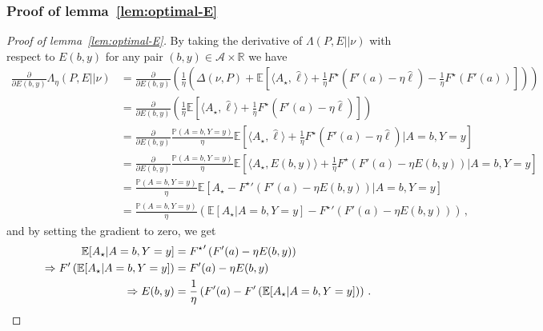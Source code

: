 \documentclass{article}
\theoremstyle{plain}
\theoremstyle{definition}
\renewcommand{\P}{\mathbb{P}}
\newcommand{\R}{\mathbb R}
\newcommand{\E}{\mathbb E}
\newcommand{\cA}{\mathcal A}
\newcommand{\hl}{\hat{\ell}\xspace}
\begin{document}
\subsubsection{Proof of lemma~\ref{lem:optimal-E}}
\label{proof:lem:optimal-E}
\begin{proof}[Proof of lemma~\ref{lem:optimal-E}]
    By taking the derivative of $\Lambda(P, E || \nu)$ with respect to $E(b,y)$
    for any pair $(b,y) \in \cA \times \R$ we have
    \begin{align*}
        \tfrac{\partial}{\partial E(b,y)} \Lambda_\eta(P, E || \nu)
         & =
        \tfrac{\partial}{\partial E(b,y)}
        \left(
        \frac{1}{\eta}
        \left(
            \Delta(\nu, P) +
            \E\!\left[
                    \langle A_\star, \hl \rangle
                    + \frac{1}{\eta} F^\star\left(F'(a) - \eta \hl\right)
                    - \frac{1}{\eta} F^\star(F'(a))
                    \right]
            \right)
        \right)
        \\
         & =
        \tfrac{\partial}{\partial E(b,y)}
        \left(
        \frac{1}{\eta}
        \E\!\left[
                \langle A_\star, \hl \rangle
                + \frac{1}{\eta} F^\star\left(F'(a) - \eta \hl\right)
                \right]
        \right) \\
         & =
        \tfrac{\partial}{\partial E(b,y)}
        \tfrac{\P(A=b, Y=y)}{\eta}
        \E\!\left[
            \langle A_\star, \hl \rangle
            + \frac{1}{\eta} F^\star\left(F'(a) - \eta \hl\right)
            \bigg| A = b, Y = y
        \right] \\
         & =
        \tfrac{\partial}{\partial E(b,y)}
        \tfrac{\P(A=b, Y=y)}{\eta}
        \E\!\left[
            \langle A_\star, E(b, y) \rangle
            + \frac{1}{\eta} F^\star\left(F'(a) - \eta E(b, y)\right)
            \bigg|A = b, Y = y
        \right] \\
         & =
        \tfrac{\P(A=b, Y=y)}{\eta}
        \E\!\left[
        A_\star
        - {F^\star}'\left(F'(a) - \eta E(b, y)\right)
        \bigg| A = b, Y = y
        \right] \\
         & =
        \tfrac{\P(A=b, Y=y)}{\eta}
        \left(
        \E\!\left[
            A_\star
            |A = b, Y = y\right]
        - {F^\star}'\left(F'(a) - \eta E(b, y)\right)
        \right)\,,
    \end{align*}
    and by setting the gradient to zero, we get
    \begin{align*}
        \E\!\left[
            A_\star
            | A = b, Y = y\right]
         & = {F^\star}'\left(F'(a) - \eta E(b, y)\right) \\
        \Rightarrow
        F'\left(\E\!\left[
            A_\star
            | A = b, Y = y\right]\right)
         & = F'(a) - \eta E(b, y)                        \\
        \Rightarrow
        E(b, y)
         & =
        \frac{1}{\eta}
        \left(
        F'(a)
        -
        F'\left(\E\!\left[
            A_\star
            | A = b, Y = y\right]\right)
        \right)\,. \qedhere
    \end{align*}
\end{proof}
\end{document}
